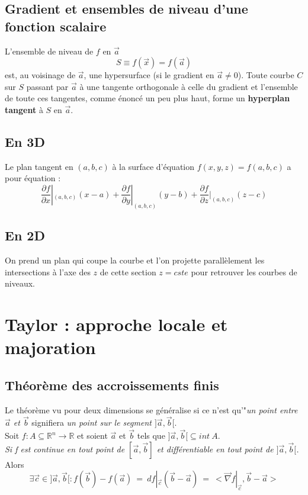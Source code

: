 \documentclass	[11pt, a4paper, openany]{book}
\begin{document}
\subsection{Gradient et ensembles de niveau d'une fonction scalaire}
L'ensemble de niveau de $f$ en $\vec{a}$
$$S \equiv f(\vec{x}) = f(\vec{a})$$
est, au voisinage de $\vec{a}$, une hypersurface (si le gradient en $\vec{a} \neq 0$). Toute courbe $C$ sur $S$ passant par $\vec{a}$ à une tangente orthogonale à celle du gradient et l'ensemble de toute ces tangentes, comme énoncé un peu plus haut, forme un \textbf{hyperplan tangent} à $S$ en $\vec{a}$.

\subsection*{En 3D}
Le plan tangent en $(a, b, c)$ à la surface d'équation $f(x,y,z) = f(a, b, c)$ a pour équation :
$$\frac{\partial f}{\partial x}|_{(a, b, c)} (x-a) + \frac{\partial f}{\partial y}|_{(a, b, c)} (y-b) + \frac{\partial f}{\partial z}|_{(a, b, c)} (z-c)$$

\subsection*{En 2D}
On prend un plan qui coupe la courbe et l'on projette parallèlement les intersections à l'axe des $z$ de cette section $z = cste$ pour retrouver les courbes de niveaux.

\section{Taylor : approche locale et majoration}
\subsection{Théorème des accroissements finis}
Le théorème vu pour deux dimensions se généralise si ce n'est qu'"\textit{un point entre $\vec{a}$ et $\vec{b}$} signifiera \textit{un point sur le segment $]\vec{a}, \vec{b}[$}.
\\

Soit $f : A \subseteq \mathbb{R}^n \rightarrow \mathbb{R}$ et soient $\vec{a}$ et $\vec{b}$ tels que $]\vec{a}, \vec{b}[ \subseteq int\ A$.\\
\textit{Si f est continue en tout point de $[\vec{a}, \vec{b}]$ et différentiable en tout point de $]\vec{a}, \vec{b}[$.}\\
Alors
$$\exists \vec{c} \in ]\vec{a}, \vec{b}[ : f(\vec{b}) - f(\vec{a})\ =\ df|_{\vec{c}} (\vec{b} - \vec{a})\ =\ < \vec{\nabla}f|_{\vec{c}}, \vec{b} - \vec{a} >$$
\end{document}
